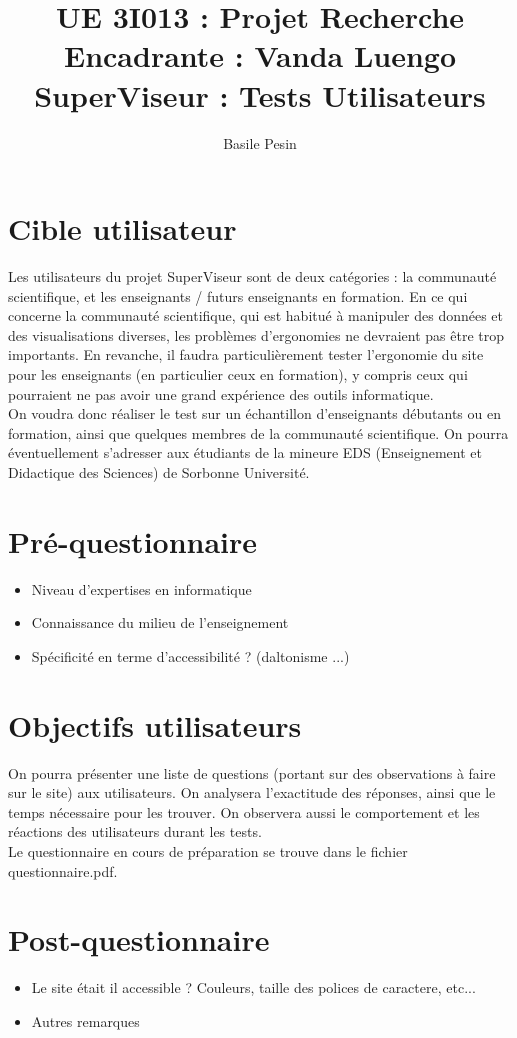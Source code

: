 \documentclass{article}
\title{UE 3I013 : Projet Recherche\\
    Encadrante : Vanda Luengo\\
    SuperViseur : Tests Utilisateurs}
\author{Basile Pesin}
\begin{document}
\maketitle
\newpage

\section{Cible utilisateur}
Les utilisateurs du projet SuperViseur sont de deux catégories : la communauté scientifique, et les enseignants / futurs enseignants en formation. En ce qui concerne la communauté scientifique, qui est habitué à manipuler des données et des visualisations diverses, les problèmes d'ergonomies ne devraient pas être trop importants. En revanche, il faudra particulièrement tester l'ergonomie du site pour les enseignants (en particulier ceux en formation), y compris ceux qui pourraient ne pas avoir une grand expérience des outils informatique.\\
On voudra donc réaliser le test sur un échantillon d'enseignants débutants ou en formation, ainsi que quelques membres de la communauté scientifique. On pourra éventuellement s'adresser aux étudiants de la mineure EDS (Enseignement et Didactique des Sciences) de Sorbonne Université.

\section{Pré-questionnaire}
\begin{itemize}
    \item Niveau d'expertises en informatique
    \item Connaissance du milieu de l'enseignement
    \item Spécificité en terme d'accessibilité ? (daltonisme ...)
\end{itemize}

\section{Objectifs utilisateurs}
On pourra présenter une liste de questions (portant sur des observations à faire sur le site) aux utilisateurs. On analysera l'exactitude des réponses, ainsi que le temps nécessaire pour les trouver. On observera aussi le comportement et les réactions des utilisateurs durant les tests.\\
Le questionnaire en cours de préparation se trouve dans le fichier questionnaire.pdf.

\section{Post-questionnaire}
\begin{itemize}
    \item Le site était il accessible ? Couleurs, taille des polices de caractere, etc...
    \item Autres remarques
\end{itemize}
\end{document}
